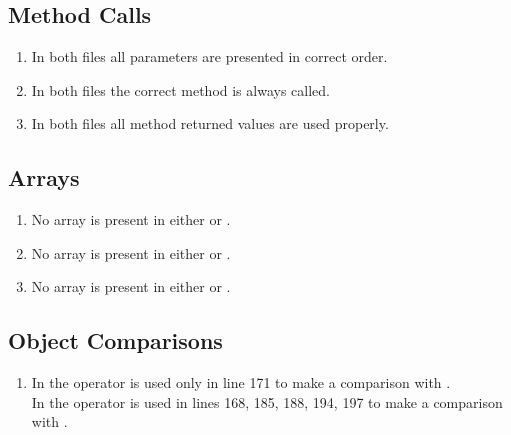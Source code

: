\subsection{Method Calls}
\begin{enumerate}[NUM]
    \item In both files all parameters are presented in correct order.
  
    \item In both files the correct method is always called.
    
    \item In both files all method returned values are used properly.

\end{enumerate}

\subsection{Arrays}
\begin{enumerate}[NUM]
    \item No array is present in either  or .
   
    \item No array is present in either  or .
    
    \item No array is present in either  or .
\end{enumerate}

\subsection{Object Comparisons}
\begin{enumerate}[NUM]
    \item In  the \code{==} operator is used only in line 171 to make a comparison with .\\
    In  the \code{==} operator is used in lines 168, 185, 188, 194, 197 to make a comparison with .
\end{enumerate}

